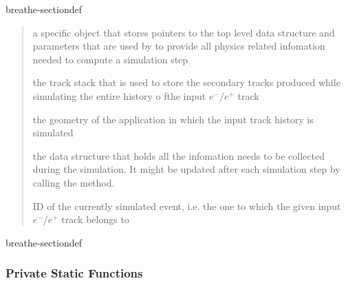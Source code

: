\documentclass[letterpaper,10pt,english]{sphinxmanual}
\begin{document}
\begin{fulllineitems}
\begin{sphinxuseclass}{breathe-sectiondef}
\begin{fulllineitems}
\begin{quote}
\begin{description}
\sphinxAtStartPar
a  specific object that stores pointers to the top level  data structure and parameters that are used by  to provide all physics related infomation needed to compute a simulation step 

\sphinxAtStartPar
the track stack that is used to store the secondary tracks produced while simulating the entire history o fthe input \(e^-/e^+\) track 

\sphinxAtStartPar
the geometry of the application in which the input track history is simulated 

\sphinxAtStartPar
the data structure that holds all the infomation needs to be collected during the simulation. It might be updated after each simulation step by calling the  method. 

\sphinxAtStartPar
ID of the currently simulated event, i.e. the one to which the given input \(e^-/e^+\) track belongs to 

\end{description}\end{quote}


\end{fulllineitems}


\end{sphinxuseclass}
\begin{sphinxuseclass}{breathe-sectiondef}\subsubsection*{Private Static Functions}


\end{sphinxuseclass}
\end{fulllineitems}
\end{document}
